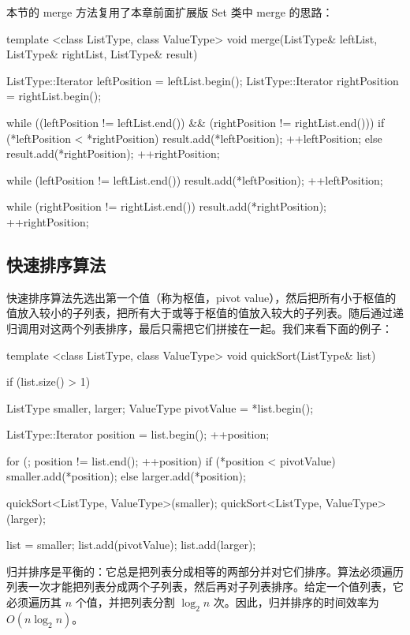 本节的 merge 方法复用了本章前面扩展版 Set 类中 merge 的思路：

\begin{codebox}
template <class ListType, class ValueType>
void merge(ListType& leftList, ListType& rightList,
           ListType& result) {
  ListType::Iterator leftPosition = leftList.begin();
  ListType::Iterator rightPosition = rightList.begin();

  while ((leftPosition != leftList.end()) &&
         (rightPosition != rightList.end())) {
    if (*leftPosition < *rightPosition) {
      result.add(*leftPosition);
      ++leftPosition;
    }
    else {
      result.add(*rightPosition);
      ++rightPosition;
    }
  }

  while (leftPosition != leftList.end()) {
    result.add(*leftPosition);
    ++leftPosition;
  }

  while (rightPosition != rightList.end()) {
    result.add(*rightPosition);
    ++rightPosition;
  }
}
\end{codebox}

\subsection{快速排序算法}

快速排序算法先选出第一个值（称为枢值，pivot value），然后把所有小于枢值的值放入较小的子列表，把所有大于或等于枢值的值放入较大的子列表。随后通过递归调用对这两个列表排序，最后只需把它们拼接在一起。我们来看下面的例子：

\begin{codebox}
template <class ListType, class ValueType>
void quickSort(ListType& list) {
  if (list.size() > 1) {
    ListType smaller, larger;
    ValueType pivotValue = *list.begin();

    ListType::Iterator position = list.begin();
    ++position;

    for (; position != list.end(); ++position) {
      if (*position < pivotValue) {
        smaller.add(*position);
      }
      else {
        larger.add(*position);
      }
    }

    quickSort<ListType, ValueType>(smaller);
    quickSort<ListType, ValueType>(larger);

    list = smaller;
    list.add(pivotValue);
    list.add(larger);
  }
}
\end{codebox}

归并排序是平衡的：它总是把列表分成相等的两部分并对它们排序。算法必须遍历列表一次才能把列表分成两个子列表，然后再对子列表排序。给定一个值列表，它必须遍历其 $n$ 个值，并把列表分割 $\log_2 n$ 次。因此，归并排序的时间效率为 $O(n \log_2 n)$。

